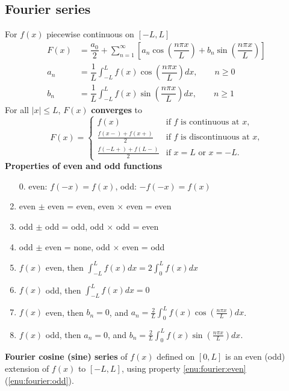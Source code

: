\documentclass[10pt,leqno]{article}
\begin{document}
\begin{multicols}{2}
\subsection*{Fourier series}
For $f(x)$ piecewise continuous on $[-L, L]$
\begin{align}
    F(x) &= \dfrac{a_{0}}{2} + \sum_{n=1}^{\infty} \left[ a_{n}\cos\left(\dfrac{n\pi x}{L}\right)+b_{n}\sin\left(\dfrac{n\pi x}{L}\right) \right] \\
    a_{n} &= \dfrac{1}{L} \int_{-L}^{L} f(x)\cos\left(\dfrac{n\pi x}{L}\right) dx, \qquad n\geq 0 \\
    b_{n} &= \dfrac{1}{L} \int_{-L}^{L} f(x)\sin\left(\dfrac{n\pi x}{L}\right) dx, \qquad n\geq 1
\end{align}
For all $|x|\leq L$, $F(x)$ \textbf{converges} to
\begin{equation}
    F(x) = \begin{cases} f(x) & \text{if $f$ is continuous at $x$,} \\[0.5em]
        \tfrac{f(x{-})+f(x{+})}{2} & \text{if $f$ is discontinuous at $x$,} \\[0.5em]
        \tfrac{f(-L{+})+f(L{-})}{2} & \text{if $x=L$ or $x=-L$.} \end{cases} 
\end{equation}
% 
\textbf{Properties of even and odd functions}
\begin{enumerate}
    \item[0.] even: $f(-x)=f(x)$, odd: $-f(-x)=f(x)$
     \item even $\pm$ even = even, \quad even $\times$ even = even
     \item odd $\pm$ odd = odd, \quad odd $\times$ odd = even
     \item odd $\pm$ even = none, \quad odd $\times$ even = odd
     \item $f(x)$ even, then $\int_{-L}^{L}f(x)dx= 2\int_{0}^{L}f(x)dx$
     \item $f(x)$ odd, then $\int_{-L}^{L}f(x)dx= 0$
     \item $f(x)$ even, then $b_{n}=0$, and $a_{n}=\frac{2}{L}\int_{0}^{L}f(x)\cos\left( \tfrac{n\pi x}{L} \right)dx$. \label{enu:fourier:even}
     \item $f(x)$ odd, then  $a_{n}=0$, and $b_{n}=\frac{2}{L}\int_{0}^{L}f(x)\sin\left( \tfrac{n\pi x}{L} \right)dx$. \label{enu:fourier:odd}
\end{enumerate}
\textbf{Fourier cosine (sine) series} of $f(x)$ defined on $[0,L]$ is an even (odd) extension of $f(x)$ to $[-L,L]$, using property \ref{enu:fourier:even} (\ref{enu:fourier:odd}).


\end{multicols}
\end{document}
